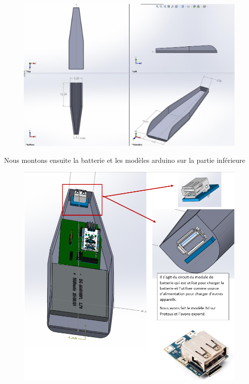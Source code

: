 \begin{figure}[!htbp]
    \centering
    \includegraphics[width=\linewidth]{assets/conception1/img144.jpg}
\end{figure}

\FloatBarrier

Nous montons ensuite la batterie et les modèles arduino sur la partie inférieure

\begin{figure}[!htbp]
    \centering
    \includegraphics[width=\linewidth]{assets/conception1/6.png}
\end{figure}

